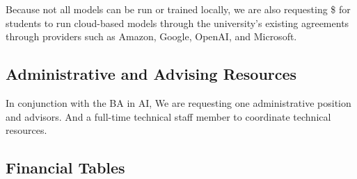 Because not all models can be run or trained locally, we are also requesting \$\cloud{} for students to run cloud-based models through the university's existing agreements through providers such as Amazon, Google, OpenAI, and Microsoft.

\subsection{Administrative and Advising Resources}



In conjunction with the BA in AI, We are requesting one administrative position and \advisors{} advisors.  And a full-time technical staff member to coordinate technical resources.

\subsection{Financial Tables}
